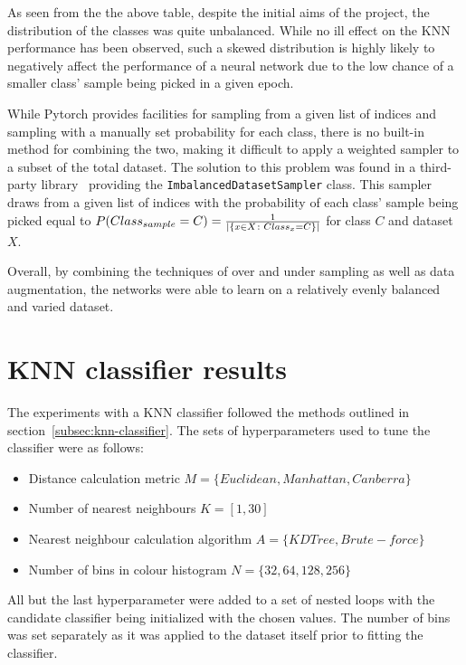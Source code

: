 As seen from the the above table, despite the initial aims of the project, the distribution of the classes was quite unbalanced.
While no ill effect on the KNN performance has been observed, such a skewed distribution is highly likely to negatively
affect the performance of a neural network due to the low chance of a smaller class' sample being picked in a given epoch.

While Pytorch provides facilities for sampling from a given list of indices and sampling with a manually set probability for each class,
there is no built-in method for combining the two, making it difficult to apply a weighted sampler to a subset of the total dataset.
The solution to this problem was found in a third-party library~\cite{imbalancedSampler} providing the \verb|ImbalancedDatasetSampler| class.
This sampler draws from a given list of indices with the probability of each class' sample being picked equal to
$P(Class_{sample} = C) = \frac{1}{\arrowvert\{x \in X \colon Class_x = C\}\arrowvert}$ for class $C$ and dataset $X$.

Overall, by combining the techniques of over and under sampling as well as data augmentation, the networks were able to learn on a relatively
evenly balanced and varied dataset.
\section{KNN classifier results}
\label{sec:knn-results}
The experiments with a KNN classifier followed the methods outlined in section~\ref{subsec:knn-classifier}.
The sets of hyperparameters used to tune the classifier were as follows:
\begin{itemize}
    \item Distance calculation metric $M = \{Euclidean, Manhattan, Canberra\}$
    \item Number of nearest neighbours $K = [1, 30]$
    \item Nearest neighbour calculation algorithm $A = \{KDTree, Brute-force\}$
    \item Number of bins in colour histogram $N = \{32, 64, 128, 256\}$
\end{itemize}

All but the last hyperparameter were added to a set of nested loops with the candidate classifier being initialized with the
chosen values.
The number of bins was set separately as it was applied to the dataset itself prior to fitting the classifier.

